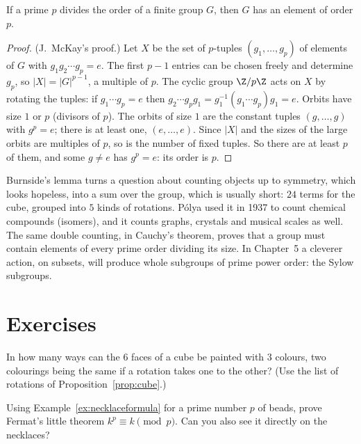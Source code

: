 \begin{theorem}[Cauchy]\label{thm:cauchy}
If a prime $p$ divides the order of a finite group $G$, then $G$ has an element of order $p$.
\end{theorem}
\begin{proof}
(J.~McKay's proof.) Let $X$ be the set of $p$-tuples $(g_1,\dots,g_p)$ of elements of $G$ with $g_1g_2\cdots g_p=e$. The first $p-1$ entries can be chosen freely and determine $g_p$, so $|X|=|G|^{p-1}$, a multiple of $p$. The cyclic group $\Z/p\Z$ acts on $X$ by rotating the tuples: if $g_1\cdots g_p=e$ then $g_2\cdots g_pg_1=g_1^{-1}(g_1\cdots g_p)g_1=e$. Orbits have size $1$ or $p$ (divisors of $p$). The orbits of size $1$ are the constant tuples $(g,\dots,g)$ with $g^p=e$; there is at least one, $(e,\dots,e)$. Since $|X|$ and the sizes of the large orbits are multiples of $p$, so is the number of fixed tuples. So there are at least $p$ of them, and some $g\ne e$ has $g^p=e$: its order is $p$.
\end{proof}

\begin{beauty}
Burnside's lemma turns a question about counting objects up to symmetry, which looks hopeless, into a sum over the group, which is usually short: $24$ terms for the cube, grouped into $5$ kinds of rotations. P\'olya used it in 1937 to count chemical compounds (isomers), and it counts graphs, crystals and musical scales as well. The same double counting, in Cauchy's theorem, proves that a group must contain elements of every prime order dividing its size. In Chapter~5 a cleverer action, on subsets, will produce whole subgroups of prime power order: the Sylow subgroups.
\end{beauty}

\section{Exercises}

\begin{exercise}[$\star$]\label{ex:cubefaces}
In how many ways can the $6$ faces of a cube be painted with $3$ colours, two colourings being the same if a rotation takes one to the other? (Use the list of rotations of Proposition~\ref{prop:cube}.)
\end{exercise}

\begin{exercise}[$\star$]\label{ex:fermatnecklace}
Using Example~\ref{ex:necklaceformula} for a prime number $p$ of beads, prove Fermat's little theorem $k^p\equiv k\pmod p$. Can you also see it directly on the necklaces?
\end{exercise}

